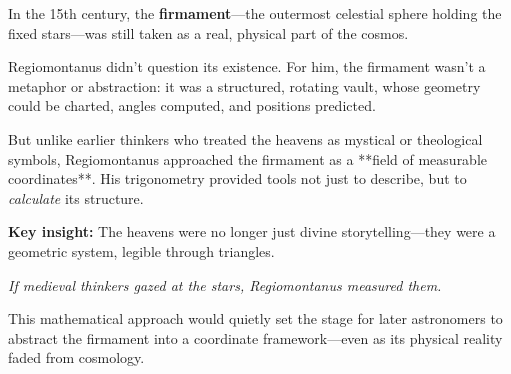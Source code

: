 \begin{tcolorbox}[colback=gray!5, colframe=black, title=\textbf{Historical Sidebar: Regiomontanus and the Measurable Firmament}, fonttitle=\bfseries, arc=1.5mm, boxrule=0.4pt]

  In the 15th century, the \textbf{firmament}—the outermost celestial sphere holding the fixed stars—was still taken as a real, physical part of the cosmos.
  
  Regiomontanus didn’t question its existence. For him, the firmament wasn’t a metaphor or abstraction: it was a structured, rotating vault, whose geometry could be charted, angles computed, and positions predicted.
  
  But unlike earlier thinkers who treated the heavens as mystical or theological symbols, Regiomontanus approached the firmament as a **field of measurable coordinates**. His trigonometry provided tools not just to describe, but to \emph{calculate} its structure.
  
  \medskip
  
  \textbf{Key insight:} The heavens were no longer just divine storytelling—they were a geometric system, legible through triangles.
  
  \begin{center}
  \emph{If medieval thinkers gazed at the stars, Regiomontanus measured them.}
  \end{center}
  
  This mathematical approach would quietly set the stage for later astronomers to abstract the firmament into a coordinate framework—even as its physical reality faded from cosmology.
  
  \end{tcolorbox}
